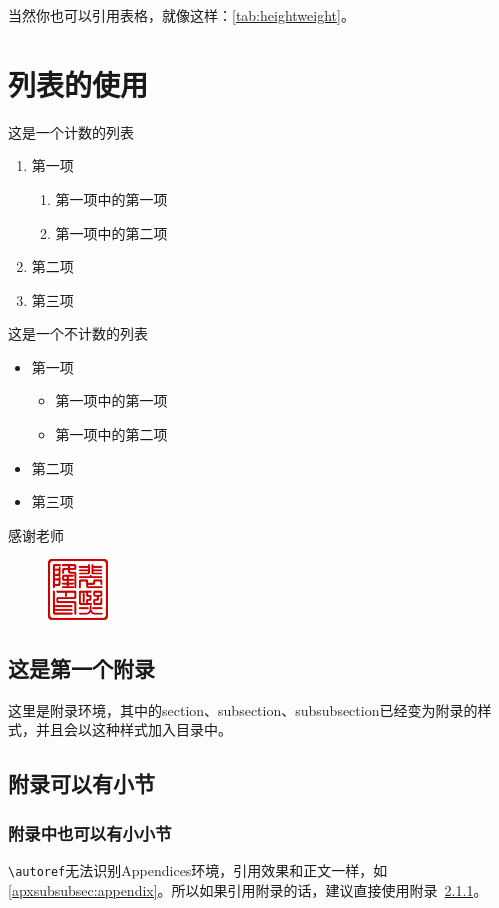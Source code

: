 \documentclass[supercite]{HustGraduPaper}
\begin{document}
	当然你也可以引用表格，就像这样：\autoref{tab:heightweight}。
	
	\section{列表的使用}
	这是一个计数的列表
	\begin{enumerate}
		\item 第一项
		\begin{enumerate}
			\item 第一项中的第一项
			\item 第一项中的第二项
		\end{enumerate}
		\item 第二项
		\item 第三项
	\end{enumerate}
	
	这是一个不计数的列表
	\begin{itemize}
		\item 第一项
		\begin{itemize}
			\item 第一项中的第一项
			\item 第一项中的第二项
		\end{itemize}
		\item 第二项
		\item 第三项
	\end{itemize}
	
	\begin{thankpage}
		感谢老师
		\begin{figure}[htb]
			\flushright
			\includegraphics[width=16mm]{Figures/Seal-pxl.pdf}
		\end{figure}
	\end{thankpage}
	
	
	
	\begin{appendices}
		\section{这是第一个附录}
		这里是附录环境，其中的section、subsection、subsubsection已经变为附录的样式，并且会以这种样式加入目录中。
		\subsection{附录可以有小节}
		\subsubsection{附录中也可以有小小节}\label{apxsubsubsec:appendix}
		\verb|\autoref|无法识别Appendices环境，引用效果和正文一样，如\autoref{apxsubsubsec:appendix}。所以如果引用附录的话，建议直接使用附录~\ref{apxsubsubsec:appendix}。
	\end{appendices}
	
\end{document}
